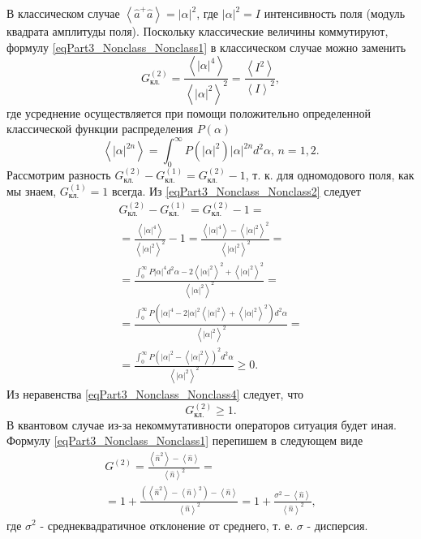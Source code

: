 В классическом случае $\left<\hat{a}^{+}\hat{a}\right> =
\left|\alpha\right|^2$, где $\left|\alpha\right|^2 = I$ интенсивность
поля (модуль квадрата амплитуды поля). Поскольку классические величины
коммутируют, формулу \eqref{eqPart3_Nonclass_Nonclass1} в классическом
случае можно заменить
\begin{equation}
G^{(2)}_{\mbox{кл.}} = 
\frac{\left<\left|\alpha\right|^4\right>}{\left<\left|\alpha\right|^2\right>^2}
= 
\frac{\left<I^2\right>}{\left<I\right>^2},
\label{eqPart3_Nonclass_Nonclass2}
\end{equation}
где усреднение осуществляется при помощи положительно
определенной классической функции распределения $P\left(\alpha\right)$
\begin{equation}
\left<\left|\alpha\right|^{2n}\right> = 
\int_0^{\infty}P\left(\left|\alpha\right|^2\right)
\left|\alpha\right|^{2n}d^2\alpha, \, n=1,2.
\nonumber
\end{equation}
Рассмотрим разность 
$G^{(2)}_{\mbox{кл.}} - G^{(1)}_{\mbox{кл.}} = G^{(2)}_{\mbox{кл.}} -
1$, т. к. для одномодового поля, как мы знаем, $G^{(1)}_{\mbox{кл.}} =
1$ всегда. Из \eqref{eqPart3_Nonclass_Nonclass2} следует
\begin{eqnarray}
G^{(2)}_{\mbox{кл.}} - G^{(1)}_{\mbox{кл.}} = G^{(2)}_{\mbox{кл.}} -
1 = 
\nonumber \\
=
\frac{\left<\left|\alpha\right|^4\right>}{\left<\left|\alpha\right|^2\right>^2}
- 1 = 
\frac{\left<\left|\alpha\right|^4\right> -
  \left<\left|\alpha\right|^2\right>^2}{\left<\left|\alpha\right|^2\right>^2}
= 
\nonumber \\
= \frac{\int_0^{\infty} P \left|\alpha\right|^4 d^2\alpha - 2
  \left<\left|\alpha\right|^2\right>^2 +
  \left<\left|\alpha\right|^2\right>^2}{\left<\left|\alpha\right|^2\right>^2}
= 
\nonumber \\
= 
\frac{\int_0^{\infty} P \left(\left|\alpha\right|^4  - 2
  \left|\alpha\right|^2
  \left<\left|\alpha\right|^2\right> +
  \left<\left|\alpha\right|^2\right>^2\right)d^2\alpha}
     {\left<\left|\alpha\right|^2\right>^2}
=
\nonumber \\
=
\frac{\int_0^{\infty} P \left(\left|\alpha\right|^2  - 
  \left<\left|\alpha\right|^2\right>\right)^2d^2\alpha}{\left<\left|\alpha\right|^2\right>^2}
\ge 0.
\label{eqPart3_Nonclass_Nonclass4}
\end{eqnarray}
Из неравенства \eqref{eqPart3_Nonclass_Nonclass4} следует, что
\begin{equation}
G^{(2)}_{\mbox{кл.}} \ge 1.
\nonumber
\end{equation}
В квантовом случае из-за некоммутативности операторов ситуация будет
иная. Формулу \eqref{eqPart3_Nonclass_Nonclass1} перепишем в следующем
виде
\begin{eqnarray}
G^{(2)} = \frac{\left<\hat{n}^2\right> - \left<\hat{n}\right>}{\left<\hat{n}\right>^2} = 
\nonumber \\
=
1 + \frac{\left(\left<\hat{n}^2\right> - \left<\hat{n}\right>^2\right) -
  \left<\hat{n}\right>}{\left<\hat{n}\right>^2} = 1 + \frac{\sigma^2 -
  \left<\hat{n}\right>}{\left<\hat{n}\right>^2}, 
\label{eqPart3_Nonclass_Nonclass6}
\end{eqnarray}
где $\sigma^2$ - среднеквадратичное отклонение от среднего,
т. е. $\sigma$ - дисперсия. 

